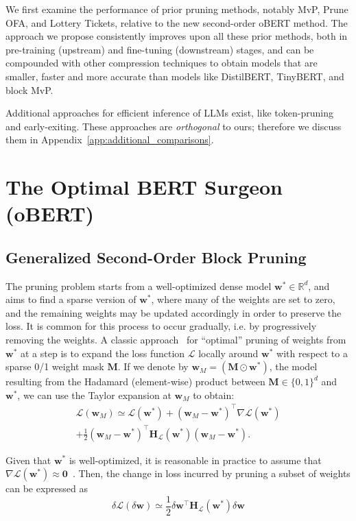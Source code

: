 \documentclass[11pt]{article}
\newcommand{\vect}[1]{\mathbf{#1}}
\newcommand{\wm}{\vect{w}_M}
\newcommand{\ws}{\vect{w}^*}
\newcommand{\w}{\mathbf{w}}
\newcommand{\hess}{\vect{H_{\mathcal{L}}}}
\newcommand{\dw}{\delta \w}
\newcommand{\dL}{\delta \mathcal{L}}
\begin{document}
We first examine the performance of prior pruning methods, notably MvP, Prune OFA, and Lottery Tickets, relative to the new second-order oBERT method. The approach we propose consistently improves upon all these prior methods, both in pre-training (upstream) and fine-tuning (downstream) stages, and can be compounded with other compression techniques to obtain models that are smaller, faster and more accurate than models like DistilBERT, TinyBERT, and block MvP. 

Additional approaches for efficient inference of LLMs exist, like token-pruning and early-exiting. These approaches are \emph{orthogonal} to ours; therefore we discuss them in Appendix~\ref{app:additional_comparisons}.

\section{The Optimal BERT Surgeon (oBERT)}
\label{sec:obs}

\subsection{Generalized Second-Order Block Pruning}

The pruning problem starts from a well-optimized dense model \( \ws \in \mathbb{R}^d \), and aims to find a sparse version of $\ws$, where many of the weights are set to zero, 
and the remaining weights may be updated accordingly in order to preserve the loss. 
It is common for this process to occur gradually, i.e. by progressively removing the weights. 
A classic approach~\cite{LeCun1989OptimalBD, hassibi1993second}  for ``optimal'' pruning of weights from $\ws$ at a step is to expand the loss function $\mathcal{L}$ locally around $\ws$ with respect to a sparse 0/1 weight mask $\vect{M}$. If we denote by $\w_M = (\vect{M} \odot \ws)$, the model resulting from the Hadamard (element-wise) product between \( \vect{M} \in \{0,1\}^d \) and $\ws$, we can use the Taylor expansion at $\w_M$ to obtain: 
\begin{eqnarray*}
    \mathcal{L}(\wm) \simeq \mathcal{L}(\ws) + (\wm - \ws)^\top \nabla \mathcal{L}(\ws) \\ + \frac{1}{2} (\wm - \ws)^\top \hess (\ws) (\wm - \ws). 
\end{eqnarray*}

\noindent Given that $\ws$ is well-optimized, it is reasonable in practice to assume that \( \nabla \mathcal{L}(\ws) \approx \vect{0} \)~\cite{Singh2020WoodFisherES}.
Then, the change in loss incurred by pruning a subset of weights can be expressed as
\begin{equation}
\label{eq:delta-loss}
    \dL (\dw) \simeq \frac{1}{2} \dw^\top \hess (\ws) \dw 
\end{equation}
\end{document}
